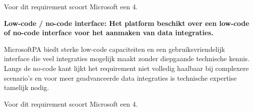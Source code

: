 Voor dit requirement scoort Microsoft een 4.

\vspace{\baselineskip}

\textbf{Low-code / no-code interface: Het platform beschikt over een low-code of no-code interface voor het aanmaken van data integraties.}

\vspace{\baselineskip}

MicrosoftPA biedt sterke low-code capaciteiten en een gebruiksvriendelijk interface die veel integraties mogelijk maakt zonder diepgaande technische kennis. Langs de no-code kant lijkt het requirement niet volledig haalbaar bij complexere scenario's en voor meer geadvanceerde data integraties is technische expertise tamelijk nodig.

Voor dit requirement scoort Microsoft een 4.

\newpage

